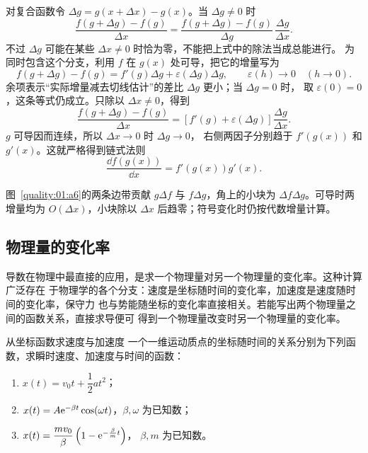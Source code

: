 {\begin{xesolution}
对复合函数令 $\Delta g=g(x+\Delta x)-g(x)$。当 $\Delta g\ne0$ 时
\[
 \frac{f(g+\Delta g)-f(g)}{\Delta x}
 =\frac{f(g+\Delta g)-f(g)}{\Delta g}\,
  \frac{\Delta g}{\Delta x}.
\]
不过 $\Delta g$ 可能在某些 $\Delta x\ne0$ 时恰为零，不能把上式中的除法当成总能进行。
为同时包含这个分支，利用 $f$ 在 $g(x)$ 处可导，把它的增量写为
\[
 f(g+\Delta g)-f(g)=f'(g)\Delta g+\varepsilon(\Delta g)\Delta g,
 \qquad \varepsilon(h)\to0\quad(h\to0).
\]
余项表示“实际增量减去切线估计”的差比 $\Delta g$ 更小；当 $\Delta g=0$ 时，
取 $\varepsilon(0)=0$，这条等式仍成立。只除以 $\Delta x\ne0$，得到
\[
 \frac{f(g+\Delta g)-f(g)}{\Delta x}
 =[f'(g)+\varepsilon(\Delta g)]\frac{\Delta g}{\Delta x}.
\]
$g$ 可导因而连续，所以 $\Delta x\to0$ 时 $\Delta g\to0$，
右侧两因子分别趋于 $f'(g(x))$ 和 $g'(x)$。这就严格得到链式法则
\[
 \boxed{\frac{\dd f(g(x))}{\dd x}=f'(g(x))g'(x)}.
\]


图~\ref{quality:01:a6}的两条边带贡献 $g\Delta f$ 与 $f\Delta g$，角上的小块为 $\Delta f\Delta g$。可导时两增量均为 $O(\Delta x)$，小块除以 $\Delta x$ 后趋零；符号变化时仍按代数增量计算。
\end{xesolution}

\subsection{物理量的变化率}

导数在物理中最直接的应用，是求一个物理量对另一个物理量的变化率。这种计算广泛存在
于物理学的各个分支：速度是坐标随时间的变化率，加速度是速度随时间的变化率，保守力
也与势能随坐标的变化率直接相关。若能写出两个物理量之间的函数关系，直接求导便可
得到一个物理量改变时另一个物理量的变化率。

\begin{origexamplebox}{从坐标函数求速度与加速度}\label{ch01:ex:s14-1-3}
一个一维运动质点的坐标随时间的关系分别为下列函数，求瞬时速度、加速度与时间的函数：
\begin{enumerate}[label=\arabic*.,leftmargin=2.2em]
 \item $x(t)=v_0t+\dfrac12at^2$；
 \item $x(t)=A\mathrm e^{-\beta t}\cos(\omega t)$，$\beta,\omega$ 为已知数；
 \item $x(t)=\dfrac{mv_0}{\beta}\left(1-\mathrm e^{-\frac{\beta}{m}t}\right)$，
       $\beta,m$ 为已知数。
\end{enumerate}

\end{origexamplebox}

}
